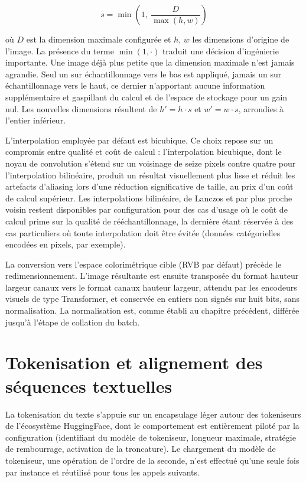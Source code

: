 \documentclass[12pt,a4paper]{report}
\begin{document}
\begin{equation}
\label{eq:facteur_echelle}
s = \min\left(1,\ \frac{D}{\max(h, w)}\right)
\end{equation}

où $D$ est la dimension maximale configurée et $h$, $w$ les dimensions d'origine de l'image. La présence du terme $\min(1, \cdot)$ traduit une décision d'ingénierie importante. Une image déjà plus petite que la dimension maximale n'est jamais agrandie. Seul un sur échantillonnage vers le bas est appliqué, jamais un sur échantillonnage vers le haut, ce dernier n'apportant aucune information supplémentaire et gaspillant du calcul et de l'espace de stockage pour un gain nul. Les nouvelles dimensions résultent de $h' = h \cdot s$ et $w' = w \cdot s$, arrondies à l'entier inférieur.

L'interpolation employée par défaut est bicubique. Ce choix repose sur un compromis entre qualité et coût de calcul : l'interpolation bicubique, dont le noyau de convolution s'étend sur un voisinage de seize pixels contre quatre pour l'interpolation bilinéaire, produit un résultat visuellement plus lisse et réduit les artefacts d'aliasing lors d'une réduction significative de taille, au prix d'un coût de calcul supérieur. Les interpolations bilinéaire, de Lanczos et par plus proche voisin restent disponibles par configuration pour des cas d'usage où le coût de calcul prime sur la qualité de rééchantillonnage, la dernière étant réservée à des cas particuliers où toute interpolation doit être évitée (données catégorielles encodées en pixels, par exemple).

La conversion vers l'espace colorimétrique cible (RVB par défaut) précède le redimensionnement. L'image résultante est ensuite transposée du format hauteur largeur canaux vers le format canaux hauteur largeur, attendu par les encodeurs visuels de type Transformer, et conservée en entiers non signés sur huit bits, sans normalisation. La normalisation est, comme établi au chapitre précédent, différée jusqu'à l'étape de collation du batch.

\section{Tokenisation et alignement des séquences textuelles}
\label{sec:tokenisation}

La tokenisation du texte s'appuie sur un encapsulage léger autour des tokeniseurs de l'écosystème HuggingFace, dont le comportement est entièrement piloté par la configuration (identifiant du modèle de tokeniseur, longueur maximale, stratégie de rembourrage, activation de la troncature). Le chargement du modèle de tokeniseur, une opération de l'ordre de la seconde, n'est effectué qu'une seule fois par instance et réutilisé pour tous les appels suivants.
\end{document}
